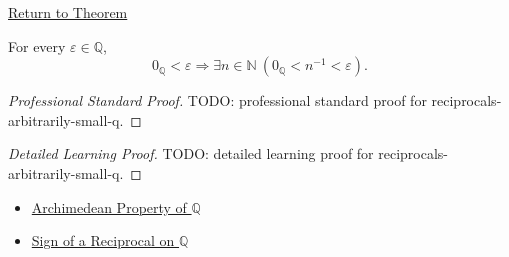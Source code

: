 \newpage
{}
\label{prf:reciprocals-arbitrarily-small-q}

\begin{remark*}[Return]
\hyperref[cor:reciprocals-arbitrarily-small-q]{Return to Theorem}
\end{remark*}

\begin{corollary*}
For every $\varepsilon\in\mathbb{Q}$,
\[
0_{\mathbb{Q}}<\varepsilon
\Longrightarrow
\exists n\in\mathbb{N}\ 
\left(0_{\mathbb{Q}}<n^{-1}<\varepsilon\right).
\]
\end{corollary*}

\begin{proof}[Professional Standard Proof]
\LRAProofBodyStart
TODO: professional standard proof for reciprocals-arbitrarily-small-q.
\end{proof}

\begin{proof}[Detailed Learning Proof]
\LRAProofBodyStart
TODO: detailed learning proof for reciprocals-arbitrarily-small-q.
\end{proof}

\begin{remark*}
\end{remark*}

\begin{dependencies}
\begin{itemize}
  \item \hyperref[thm:archimedean-property-of-q]{Archimedean Property of $\mathbb{Q}$}
  \item \hyperref[thm:sign-of-reciprocal-q]{Sign of a Reciprocal on $\mathbb{Q}$}
\end{itemize}
\end{dependencies}

\clearpage
